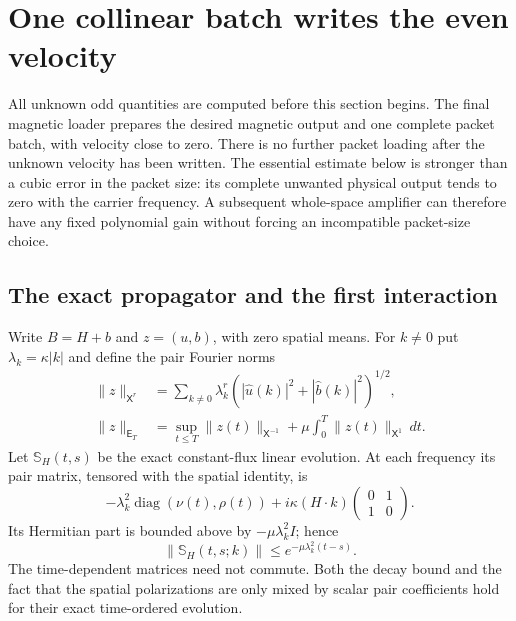 \documentclass[11pt,a4paper]{amsart}
\theoremstyle{definition}
\theoremstyle{remark}
\numberwithin{equation}{section}
\newcommand{\norm}[1]{\lVert #1\rVert}
\DeclareMathOperator{\diag}{diag}
\begin{document}
\section{One collinear batch writes the even velocity}\label{sec:readout}
All unknown odd quantities are computed before this section begins.  The
final magnetic loader prepares the desired magnetic output and one complete
packet batch, with velocity close to zero.  There is no further packet
loading after the unknown velocity has been written.  The essential estimate
below is stronger than a cubic error in the packet size: its complete
unwanted physical output tends to zero with the carrier frequency.  A
subsequent whole-space amplifier can therefore have any fixed polynomial
gain without forcing an incompatible packet-size choice.

\subsection{The exact propagator and the first interaction}
Write $B=H+b$ and $z=(u,b)$, with zero spatial means.  For $k\ne0$ put
$\lambda_k=\kappa|k|$ and define the pair Fourier norms
\begin{equation}\label{eq:rt-norms}
 \begin{aligned}
 \norm z_{\mathsf X^r}
 &=\sum_{k\ne0}\lambda_k^r
       (|\widehat u(k)|^2+|\widehat b(k)|^2)^{1/2},\\
 \norm z_{\mathsf E_T}
 &=\sup_{t\le T}\norm{z(t)}_{\mathsf X^{-1}}
                  +\mu\int_0^T\norm{z(t)}_{\mathsf X^1}\,dt.
 \end{aligned}
\end{equation}
Let $\mathbb S_H(t,s)$ be the exact constant-flux linear evolution.  At
each frequency its pair matrix, tensored with the spatial identity, is
\begin{equation}\label{eq:rt-propagator}
 -\lambda_k^2\diag(\nu(t),\rho(t))
       +i\kappa(H\cdot k)
               \begin{pmatrix}0&1\\1&0\end{pmatrix}.
\end{equation}
Its Hermitian part is bounded above by $-\mu\lambda_k^2 I$; hence
\begin{equation}\label{eq:rt-exact-decay}
 \norm{\mathbb S_H(t,s;k)}\le e^{-\mu\lambda_k^2(t-s)}.
\end{equation}
The time-dependent matrices need not commute.  Both the decay bound and
the fact that the spatial polarizations are only mixed by scalar pair
coefficients hold for their exact time-ordered evolution.
\end{document}
